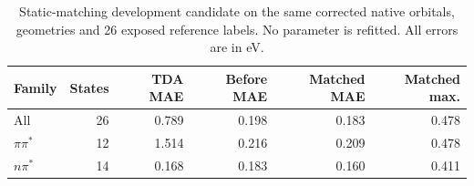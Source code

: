 \begin{table}[!htbp]\centering\small
\caption{Static-matching development candidate on the same corrected native orbitals, geometries and 26 exposed reference labels. No parameter is refitted. All errors are in eV.}
\label{tab:staticmatching}
\begin{tabular}{lrrrrr}\toprule
Family & States & TDA MAE & Before MAE & Matched MAE & Matched max.\\\midrule
All & 26 & 0.789 & 0.198 & 0.183 & 0.478\\
$\pi\pi^*$ & 12 & 1.514 & 0.216 & 0.209 & 0.478\\
$n\pi^*$ & 14 & 0.168 & 0.183 & 0.160 & 0.411\\
\bottomrule\end{tabular}
\end{table}
